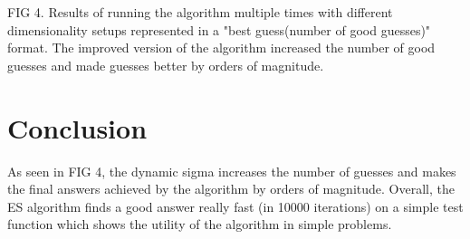 \documentclass[letterpaper, 12 pt, conference]{ieeeconf}  %
\begin{document}
\begin{center}
    FIG 4. Results of running the algorithm multiple times with different dimensionality setups represented in a "best guess(number of good guesses)" format. The improved version of the algorithm increased the number of good guesses and made guesses better by orders of magnitude.
\end{center}

\section{Conclusion}
As seen in FIG 4, the dynamic sigma increases the number of guesses and makes the final answers achieved by the algorithm by orders of magnitude. Overall, the ES algorithm finds a good answer really fast (in 10000 iterations) on a simple test function which shows the utility of the algorithm in simple problems.
\end{document}
